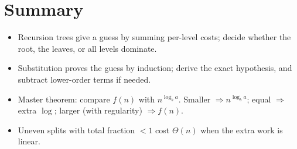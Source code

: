 \section*{Summary}
\begin{itemize}
  \item Recursion trees give a guess by summing per-level costs; decide whether the root, the leaves, or all levels dominate.
  \item Substitution proves the guess by induction; derive the exact hypothesis, and subtract lower-order terms if needed.
  \item Master theorem: compare $f(n)$ with $n^{\log_b a}$. Smaller $\Rightarrow n^{\log_b a}$; equal $\Rightarrow$ extra $\log$; larger (with regularity) $\Rightarrow f(n)$.
  \item Uneven splits with total fraction $<1$ cost $\Theta(n)$ when the extra work is linear.
\end{itemize}
